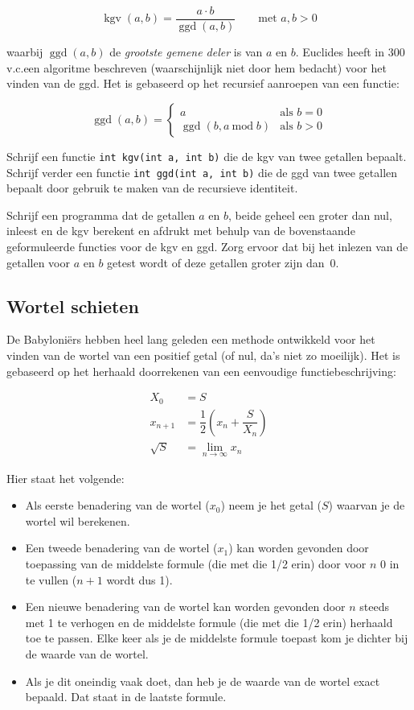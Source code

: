 \documentclass[a4paper,10pt,fleqn,twoside]{article}
\DeclareMathOperator{\kgv}{kgv}
\DeclareMathOperator{\ggd}{ggd}
\begin{document}
\begin{equation*}
\kgv(a,b) = \dfrac{a\cdot b}{\ggd(a,b)} \qquad \text{met }a,b > 0
\end{equation*}

waarbij $\ggd(a,b)$ de \textsl{grootste gemene deler} is van $a$ en $b$. 
Euclides heeft in 300 v.c.\@ een algoritme beschreven (waarschijnlijk niet door hem bedacht) voor het vinden van de ggd. Het is gebaseerd op het recursief aanroepen van een functie:

\begin{equation*}
\ggd(a,b)= \begin{cases}
a &\text{als } b = 0 \\
\ggd(b, a\:\mathrm{mod}\; b) &\text{als } b > 0
\end{cases}
\end{equation*}

Schrijf een functie \lstinline|int kgv(int a, int b)| die de kgv van twee getallen bepaalt. Schrijf verder een functie \lstinline|int ggd(int a, int b)| die de ggd van twee getallen bepaalt door gebruik te maken van de recursieve identiteit.

Schrijf een programma dat de getallen $a$ en $b$, beide geheel een groter dan nul, inleest en de kgv berekent en afdrukt met behulp van de bovenstaande geformuleerde functies voor de kgv en ggd. Zorg ervoor dat bij het inlezen van de getallen voor $a$ en $b$ getest wordt of deze getallen groter zijn dan~0.


\subsection{Wortel schieten}
De Babyloniërs hebben heel lang geleden een methode ontwikkeld voor het vinden van de wortel van een positief getal (of nul, da’s niet zo moeilijk). Het is gebaseerd op het herhaald doorrekenen van een eenvoudige functiebeschrijving:

\begin{align*}
X_0 &= S \\
x_{n+1} &= \dfrac{1}{2}\left(x_n + \dfrac{S}{X_n}\right) \\
\sqrt{S} &= \lim\limits_{n\rightarrow\infty} x_n
\end{align*}

Hier staat het volgende:

\begin{itemize}
\item Als eerste benadering van de wortel ($x_0$) neem je het getal ($S$) waarvan je de wortel wil berekenen.
\item Een tweede benadering van de wortel ($x_1$) kan worden gevonden door toepassing van de middelste formule (die met die 1/2 erin) door voor $n$ 0 in te vullen ($n+1$ wordt dus 1).
\item Een nieuwe benadering van de wortel kan worden gevonden door $n$ steeds met 1 te verhogen en de middelste formule (die met die 1/2 erin) herhaald toe te passen. Elke keer als je de middelste formule toepast kom je dichter bij de waarde van de wortel.
\item Als je dit oneindig vaak doet, dan heb je de waarde van de wortel exact bepaald. Dat staat in de laatste formule.
\end{itemize}
\end{document}
